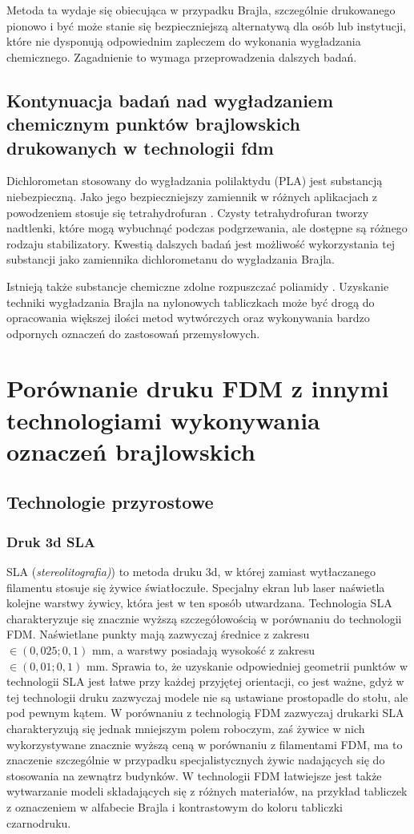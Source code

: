 \documentclass[12pt,a4paper]{article}
\begin{document}
Metoda ta wydaje się obiecująca w przypadku Brajla, szczególnie drukowanego pionowo i być może stanie się bezpieczniejszą alternatywą dla osób lub instytucji, które nie dysponują odpowiednim zapleczem do wykonania wygładzania chemicznego. Zagadnienie to wymaga przeprowadzenia dalszych badań.

\subsection{Kontynuacja badań nad wygładzaniem chemicznym punktów brajlowskich drukowanych w technologii fdm}
Dichlorometan stosowany do wygładzania polilaktydu (PLA) jest substancją niebezpieczną. Jako jego bezpieczniejszy zamiennik w różnych aplikacjach z powodzeniem stosuje się tetrahydrofuran \cite{thf}.
Czysty tetrahydrofuran tworzy nadtlenki, które mogą wybuchnąć podczas podgrzewania, ale dostępne są różnego rodzaju stabilizatory. Kwestią dalszych badań jest możliwość wykorzystania tej substancji jako zamiennika dichlorometanu do wygładzania Brajla.

Istnieją także substancje chemiczne zdolne rozpuszczać poliamidy \cite{pa}. Uzyskanie techniki wygładzania Brajla na nylonowych tabliczkach może być drogą do opracowania większej ilości metod wytwórczych oraz wykonywania bardzo odpornych oznaczeń do zastosowań przemysłowych.

\section{Porównanie druku FDM z innymi technologiami wykonywania oznaczeń brajlowskich}
\subsection{Technologie przyrostowe}
\subsubsection{Druk 3d SLA}
SLA (\emph{stereolitografia)}) to metoda druku 3d, w której zamiast wytłaczanego filamentu stosuje się żywice światłoczułe. Specjalny ekran lub laser naświetla kolejne warstwy żywicy, która jest w ten sposób utwardzana.
Technologia SLA charakteryzuje się znacznie wyższą szczegółowością w porównaniu do technologii FDM. Naświetlane punkty mają zazwyczaj średnice z zakresu $\in (0{,}025; 0{,}1) \text{ mm}$, a warstwy posiadają wysokość z zakresu $\in (0{,}01; 0{,}1) \text{ mm}$.
Sprawia to, że uzyskanie odpowiedniej geometrii punktów w technologii SLA jest łatwe przy każdej przyjętej orientacji, co jest ważne, gdyż w tej technologii druku zazwyczaj modele nie są ustawiane prostopadle do stołu, ale pod pewnym kątem.
W porównaniu z technologią FDM zazwyczaj drukarki SLA charakteryzują się jednak mniejszym polem roboczym, zaś żywice w nich wykorzystywane znacznie wyższą ceną w porównaniu z filamentami FDM, ma to znaczenie szczególnie w przypadku specjalistycznych żywic nadających się do stosowania na zewnątrz budynków. W technologii FDM łatwiejsze jest także wytwarzanie modeli składających się z różnych materiałów, na przykład tabliczek z oznaczeniem w alfabecie Brajla i kontrastowym do koloru tabliczki czarnodruku.
\end{document}
